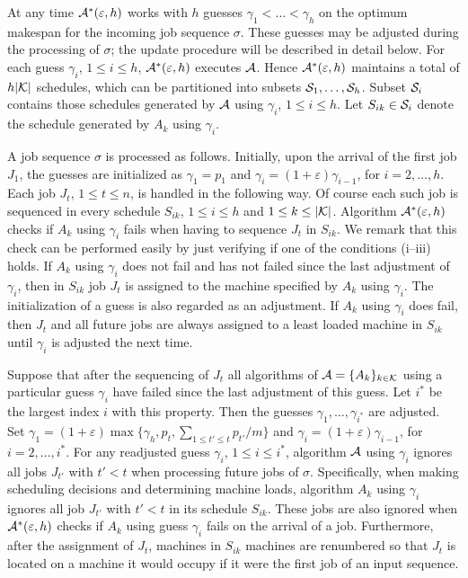 \documentclass{llncs}
\newcommand{\eps}{\varepsilon}
\begin{document}
At any time ${\cal A^*}(\eps,h)$ works with $h$ guesses $\gamma_1 < \ldots < \gamma_h$ on the optimum
makespan for the incoming job sequence $\sigma$. These guesses may be adjusted during the processing
of $\sigma$; the update procedure will be described in detail below. For each guess $\gamma_i$, $1\leq i \leq h$,
${\cal A^*}(\eps,h)$ executes ${\cal A}$. Hence ${\cal A^*}(\eps,h)$ maintains a total of $h|{\cal K}|$ schedules,
which can be partitioned into subsets ${\cal S}_1, \ldots, {\cal S}_h$. Subset ${\cal S}_i$ contains
those schedules generated by ${\cal A}$ using $\gamma_i$, $1\leq i \leq h$. Let $S_{ik}\in {\cal S}_i$
denote the schedule generated by $A_k$ using $\gamma_i$. 

A job sequence $\sigma$ is processed as follows. Initially, upon the arrival of the first job $J_1$, the
guesses are initialized as $\gamma_1 = p_1$ and $\gamma_i = (1+\eps)\gamma_{i-1}$, for $i=2, \ldots, h$. 
Each job $J_t$, $1\leq t \leq n$, is handled in the following way. Of course each such job is sequenced
in every schedule $S_{ik}$, $1\leq i \leq h$ and $1\leq k \leq |{\cal K}|$. Algorithm  ${\cal A^*}(\eps,h)$
checks if $A_k$ using $\gamma_i$ fails when having to sequence $J_t$ in $S_{ik}$. We remark that this
check can be performed easily by just verifying if one of the conditions (i--iii) holds. If $A_k$ using 
$\gamma_i$ does not fail and has not failed since the last adjustment of $\gamma_i$, then in $S_{ik}$
job $J_t$ is assigned to the machine specified by $A_k$ using $\gamma_i$. The initialization of a
guess is also regarded as an adjustment.  If $A_k$ using $\gamma_i$ does fail, then
$J_t$ and all future jobs are always assigned to a least loaded machine in $S_{ik}$
until $\gamma_i$ is adjusted the next time. 

Suppose that after the sequencing of $J_t$ all algorithms of ${\cal A} = \{A_k\}_{k\in {\cal K}}$ using
a particular guess $\gamma_i$ have failed since the last adjustment of this guess. Let $i^*$ be the
largest index $i$ with this property. Then the guesses $\gamma_1, \ldots, \gamma_{i^*}$ are adjusted.
Set $\gamma_1 = (1+\eps)\max\{\gamma_h,p_t, \sum_{1\leq t'\leq t} p_{t'}/m\}$ and 
$\gamma_i = (1+\eps)\gamma_{i-1}$, for $i=2, \ldots, i^*$. For any readjusted  guess $\gamma_i$, 
$1\leq i \leq i^*$, algorithm ${\cal A}$ using $\gamma_i$ ignores all jobs $J_{t'}$ with $t'<t$ when
processing future jobs of $\sigma$. Specifically, when making scheduling decisions and determining
machine loads, algorithm $A_k$ using $\gamma_i$ ignores all job $J_{t'}$ with $t'<t$ in its schedule
$S_{ik}$. These jobs are also ignored when ${\cal A^*}(\eps,h)$ checks if $A_k$ using guess $\gamma_i$ fails
on the arrival of a job. Furthermore, after the assignment of $J_t$, machines in $S_{ik}$ machines are renumbered
so that $J_t$ is located on a machine it would occupy if it were the first job of an input sequence. 
\end{document}
